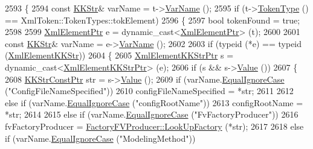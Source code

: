 \begin{DoxyCode}
2593 \{
2594   \textcolor{keyword}{const} \hyperlink{class_k_k_b_1_1_k_k_str}{KKStr}&  varName = t->\hyperlink{class_k_k_b_1_1_xml_token_a28b39cfdfa2ed63048a812b1cb52263c}{VarName} ();
2595   \textcolor{keywordflow}{if}  (t->\hyperlink{class_k_k_b_1_1_xml_token_ae98e2c1a798882647578cae4adcd7176}{TokenType} () == XmlToken::TokenTypes::tokElement)
2596   \{
2597     \textcolor{keywordtype}{bool}  tokenFound = \textcolor{keyword}{true};
2598 
2599     \hyperlink{class_k_k_b_1_1_xml_element}{XmlElementPtr}  e = \textcolor{keyword}{dynamic\_cast<}\hyperlink{class_k_k_b_1_1_xml_element}{XmlElementPtr}\textcolor{keyword}{>} (t);
2600 
2601     \textcolor{keyword}{const} \hyperlink{class_k_k_b_1_1_k_k_str}{KKStr}&  varName = e->\hyperlink{class_k_k_b_1_1_xml_element_aef57cf00be66a3a387ce849b35125f51}{VarName} ();
2602    
2603     \textcolor{keywordflow}{if}  (\textcolor{keyword}{typeid} (*e) == \textcolor{keyword}{typeid} (\hyperlink{class_k_k_b_1_1_xml_element_k_k_str}{XmlElementKKStr}))
2604     \{
2605       \hyperlink{class_k_k_b_1_1_xml_element_k_k_str}{XmlElementKKStrPtr}  s = \textcolor{keyword}{dynamic\_cast<}\hyperlink{class_k_k_b_1_1_xml_element_k_k_str}{XmlElementKKStrPtr}\textcolor{keyword}{>} (e);
2606       \textcolor{keywordflow}{if}  (s  &&  s->\hyperlink{class_k_k_b_1_1_xml_element_template_a3d671b57251b4b256fecb2197fc4a0f4}{Value} ())
2607       \{
2608         \hyperlink{class_k_k_b_1_1_k_k_str}{KKStrConstPtr}   str = s->\hyperlink{class_k_k_b_1_1_xml_element_template_a3d671b57251b4b256fecb2197fc4a0f4}{Value} ();
2609         \textcolor{keywordflow}{if}  (varName.\hyperlink{class_k_k_b_1_1_k_k_str_a562f9696417c53f66bc4088eac072ab5}{EqualIgnoreCase} (\textcolor{stringliteral}{"ConfigFileNameSpecified"}))
2610           configFileNameSpecified = *str;
2611 
2612         \textcolor{keywordflow}{else} \textcolor{keywordflow}{if}  (varName.\hyperlink{class_k_k_b_1_1_k_k_str_a562f9696417c53f66bc4088eac072ab5}{EqualIgnoreCase} (\textcolor{stringliteral}{"configRootName"}))
2613           configRootName = *str;
2614 
2615         \textcolor{keywordflow}{else} \textcolor{keywordflow}{if}  (varName.\hyperlink{class_k_k_b_1_1_k_k_str_a562f9696417c53f66bc4088eac072ab5}{EqualIgnoreCase} (\textcolor{stringliteral}{"FvFactoryProducer"}))
2616           fvFactoryProducer = \hyperlink{class_k_k_m_l_l_1_1_factory_f_v_producer_ab568f702e72172335c791744123bd63d}{FactoryFVProducer::LookUpFactory} (*str);
2617 
2618         \textcolor{keywordflow}{else} \textcolor{keywordflow}{if}  (varName.\hyperlink{class_k_k_b_1_1_k_k_str_a562f9696417c53f66bc4088eac072ab5}{EqualIgnoreCase} (\textcolor{stringliteral}{"ModelingMethod"}))

\end{DoxyCode}
